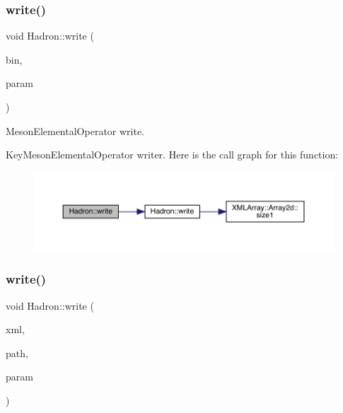 \subsubsection{\texorpdfstring{write()}{write()}\hspace{0.1cm}{\footnotesize\ttfamily [40/95]}}
{\footnotesize\ttfamily void Hadron\+::write (\begin{DoxyParamCaption}\item[{\mbox{\hyperlink{classADATIO_1_1BinaryWriter}{Binary\+Writer}} \&}]{bin,  }\item[{const \mbox{\hyperlink{structHadron_1_1KeyMesonElementalOperator__t}{Key\+Meson\+Elemental\+Operator\+\_\+t}} \&}]{param }\end{DoxyParamCaption})}



Meson\+Elemental\+Operator write. 

Key\+Meson\+Elemental\+Operator writer. Here is the call graph for this function\+:\nopagebreak
\begin{figure}[H]
\begin{center}
\leavevmode
\includegraphics[width=350pt]{d1/daf/namespaceHadron_abb7bfe7ab47ecc24ac8d489bdaf701d2_cgraph}
\end{center}
\end{figure}
\mbox{\label{namespaceHadron_a97758f7d26a76e70e4c61d4409eff7a6}} 
\subsubsection{\texorpdfstring{write()}{write()}\hspace{0.1cm}{\footnotesize\ttfamily [41/95]}}
{\footnotesize\ttfamily void Hadron\+::write (\begin{DoxyParamCaption}\item[{\mbox{\hyperlink{classADATXML_1_1XMLWriter}{X\+M\+L\+Writer}} \&}]{xml,  }\item[{const std\+::string \&}]{path,  }\item[{const \mbox{\hyperlink{structHadron_1_1KeyPropElementalOperator__t}{Key\+Prop\+Elemental\+Operator\+\_\+t}} \&}]{param }\end{DoxyParamCaption})}



